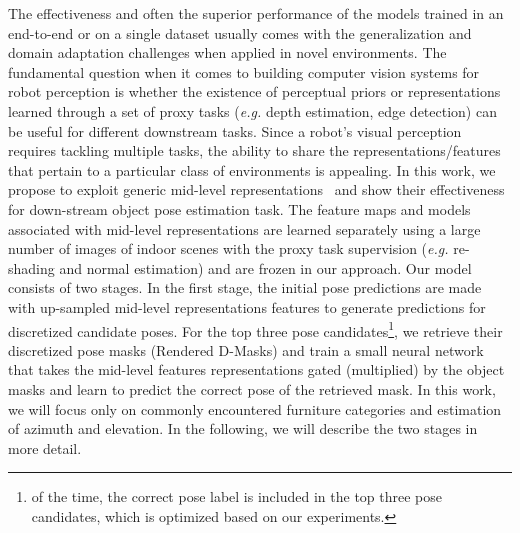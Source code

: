 \documentclass[letterpaper, 10 pt, conference]{ieeeconf}  \pdfoutput=1
\begin{document}
The effectiveness and often the superior performance of the models trained in an end-to-end or on a single dataset usually comes with the generalization and domain adaptation challenges when applied in novel environments.
The fundamental question when it comes to building computer vision systems for robot perception is whether the existence of perceptual priors or representations learned through a set of proxy tasks ({\em e.g.} depth estimation, edge detection) can be useful for different downstream tasks.  Since a robot's visual perception requires tackling multiple tasks, the ability to share the representations/features that pertain to a particular class of environments is appealing. In this work, we propose to exploit generic mid-level representations~\cite{taskonomy2018} and show their effectiveness for down-stream object pose estimation task. 
The feature maps and models associated with mid-level representations are learned separately using a large number of images of indoor scenes with the proxy task supervision ({\em e.g.} re-shading and normal estimation) and are frozen in our approach.\newline
Our model consists of two stages. In the first stage, the initial pose predictions are made with up-sampled mid-level representations features to generate predictions for discretized candidate poses. For the top three pose candidates\footnote{ of the time, the correct pose label is included in the top three pose candidates, which is optimized based on our experiments.}, we retrieve their discretized pose masks (Rendered D-Masks) and train a small neural network that takes the mid-level features representations gated (multiplied) by the object masks and learn to predict the correct pose of the retrieved mask. In this work, we will focus only on commonly encountered furniture categories and estimation of azimuth and elevation.
In the following, we will describe the two stages in more detail. 
\end{document}
